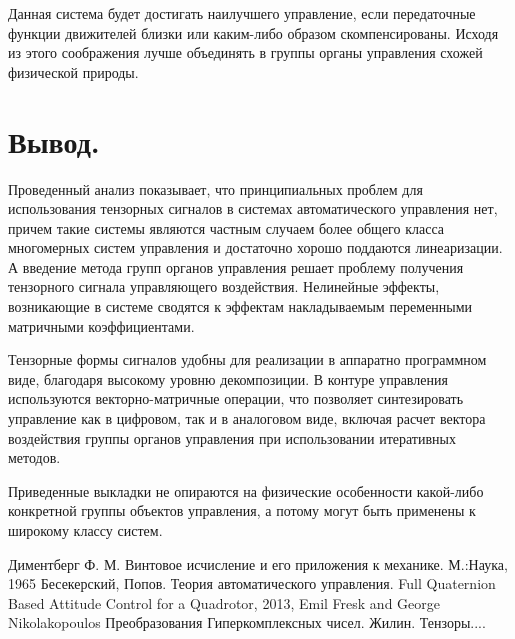 \documentclass[a4paper]{article}
\begin{document}
Данная система будет достигать наилучшего управление, если передаточные функции движителей близки или каким-либо образом скомпенсированы. Исходя из этого соображения лучше объединять в группы органы управления схожей физической природы.

\section{Вывод.}
Проведенный анализ показывает, что принципиальных проблем для использования тензорных сигналов в системах автоматического управления нет, причем такие системы являются частным случаем более общего класса многомерных систем управления и достаточно хорошо поддаются линеаризации. А введение метода групп органов управления решает проблему получения тензорного сигнала управляющего воздействия. Нелинейные эффекты, возникающие в системе сводятся к эффектам накладываемым переменными матричными коэффициентами.

Тензорные формы сигналов удобны для реализации в аппаратно программном виде, благодаря высокому уровню декомпозиции. В контуре управления используются векторно-матричные операции, что позволяет синтезировать управление как в цифровом, так и в аналоговом виде, включая расчет вектора воздействия группы органов управления при использовании итеративных методов. 

Приведенные выкладки не опираются на физические особенности какой-либо конкретной группы объектов управления, а потому могут быть применены к широкому классу систем. 



\begin{thebibliography}{9}
 Диментберг Ф. М. Винтовое исчисление и его приложения к механике. М.:Наука, 1965
 Бесекерский, Попов. Теория автоматического управления.
 Full Quaternion Based Attitude Control for a Quadrotor, 2013, Emil Fresk and George Nikolakopoulos
 Преобразования Гиперкомплексных чисел.
 Жилин. Тензоры....
\end{thebibliography}
\end{document}
